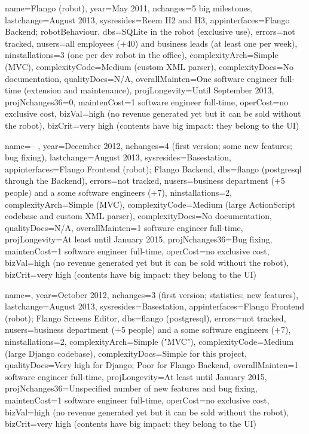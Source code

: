 \begin{inventory}
{name=Flango \cm (robot), 
year=May 2011,
nchanges=5 big milestones,
lastchange=August 2013,
sysresides=Reem H2 and H3,
appinterfaces=Flango Backend; robotBehaviour,
dbs=SQLite in the robot (exclusive use),
errors=not tracked,
nusers=all employees (+40) and business leads (at least one per week),
ninstallations=3 (one per dev robot in the office),
complexityArch=Simple (MVC),
complexityCode=Medium (custom \ac{XML} parser),
complexityDocs=No documentation,
qualityDocs=N/A,
overallMainten=One software engineer full-time (extension and maintenance),
projLongevity=Until September 2013,
projNchanges36=0,
maintenCost=1 software engineer full-time,
operCost=no exclusive cost,
bizVal=high (no revenue generated yet but it can be sold without the robot),
bizCrit=very high (contents have big impact: they belong to the \ac{UI})
}
\end{inventory}

\begin{inventory}
{
name=\flangofe -- \se , 
year=December 2012,
nchanges=4 (first version; some new features; bug fixing),
lastchange=August 2013,
sysresides=Basestation,
appinterfaces=Flango Frontend (robot); Flango Backend,
dbs=flango (postgresql through the Backend),
errors=not tracked,
nusers=business department (+5 people) and a some software engineers (+7),
ninstallations=2,
complexityArch=Simple (MVC),
complexityCode=Medium (large ActionScript codebase and custom \ac{XML} parser),
complexityDocs=No documentation,
qualityDocs=N/A,
overallMainten=1 software engineer full-time,
projLongevity=At least until January 2015,
projNchanges36=Bug fixing,
maintenCost=1 software engineer full-time,
operCost=no exclusive cost,
bizVal=high (no revenue generated yet but it can be sold without the robot),
bizCrit=very high (contents have big impact: they belong to the \ac{UI})
}
\end{inventory}

\begin{inventory}
{
name=\flangobe , 
year=October 2012,
nchanges=3 (first version; statistics; new features),
lastchange=August 2013,
sysresides=Basestation,
appinterfaces=Flango Frontend (robot); Flango Screens Editor,
dbs=flango (postgresql),
errors=not tracked,
nusers=business department (+5 people) and a some software engineers (+7),
ninstallations=2,
complexityArch=Simple ("MVC"),
complexityCode=Medium (large Django codebase),
complexityDocs=Simple for this project,
qualityDocs=Very high for Django; Poor for Flango Backend,
overallMainten=1 software engineer full-time,
projLongevity=At least until January 2015,
projNchanges36=Unspecified number of new features and bug fixing,
maintenCost=1 software engineer full-time,
operCost=no exclusive cost,
bizVal=high (no revenue generated yet but it can be sold without the robot),
bizCrit=very high (contents have big impact: they belong to the \ac{UI})
}
\end{inventory}    

